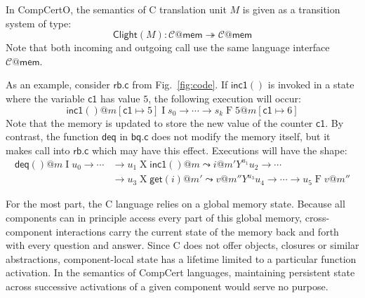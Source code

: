 \documentclass[acmsmall,screen,review,anonymous]{acmart}
\newcommand{\kw}[1]{\ensuremath{ \mathsf{#1} }}
\begin{document}
\begin{example} \label{ex:clightsem} %
In CompCertO,
the semantics of C translation unit $M$
is given as a transition system of type:
\[
  \kw{Clight}(M) : \mathcal{C}@\kw{mem} \twoheadrightarrow \mathcal{C}@\kw{mem}
\]
Note that both incoming and outgoing call
use the same language interface $\mathcal{C}@\kw{mem}$.

As an example,
consider $\kw{rb.c}$ from Fig.~\ref{fig:code}.
If $\kw{inc1}()$ is invoked in a state where the variable $\kw{c1}$ has value $5$,
the following execution will occur:
\[
  \kw{inc1}()@m[\kw{c1} \mapsto 5]
  \mathrel{I}
  s_0 \rightarrow \cdots \rightarrow s_k
  \mathrel{F}
  5@m[\kw{c1} \mapsto 6]
\]
Note that the memory is updated to store the new value of the counter $\kw{c1}$.
By contrast, the function $\kw{deq}$ in $\kw{bq.c}$
does not modify the memory itself,
but it makes call into $\kw{rb.c}$ which may have this effect.
Executions will have the shape:
\begin{align*}
  \kw{deq}()@m
  \mathrel{I}
  u_0 \rightarrow \cdots &\rightarrow u_1
  \mathrel{X}
  \kw{inc1}()@m \leadsto i@m'
  \mathrel{Y^{u_1}}
  u_2 \rightarrow \cdots \\ &\rightarrow u_3
  \mathrel{X}
  \kw{get}(i)@m' \leadsto v@m''
  \mathrel{Y^{u_3}}
  u_4 \rightarrow \cdots \rightarrow u_5
  \mathrel{F}
  v@m''
\end{align*}
\end{example}

For the most part, the C language relies on a global memory state.
Because all components can in principle access every part of this global memory,
cross-component interactions carry the current state of the memory
back and forth with every question and answer.
Since C does not offer objects, closures or similar abstractions,
component-local state has a lifetime limited to a particular function activation.
In the semantics of CompCert languages,
maintaining persistent state across successive activations of a given component
would serve no purpose.

\end{document}

